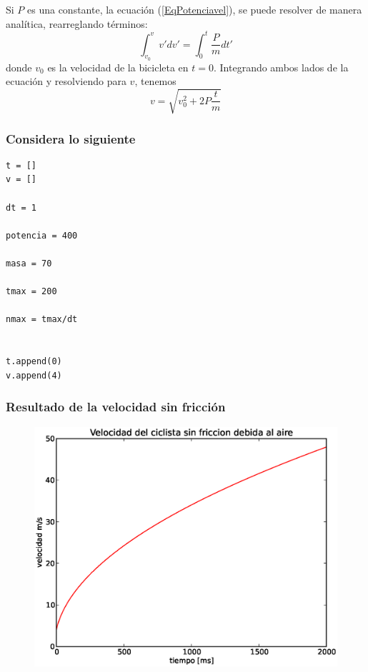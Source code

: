 \begin{frame}
Si $P$ es una constante, la ecuación (\ref{EqPotenciavel}), se puede resolver de manera analítica, rearreglando términos:
\begin{equation}\label{EqIntegral}
\int_{v_{0}}^{v} v' dv' = \int_{0}^{t} \dfrac{P}{m} dt'
\end{equation}
donde $v_{0}$ es la velocidad de la bicicleta en $t=0$. Integrando ambos lados de la ecuación y resolviendo para $v$, tenemos
\begin{equation}\label{Eqvres}
v = \sqrt{v_{0}^{2} + 2 P \dfrac{t}{m}}
\end{equation}
\end{frame}
\begin{frame}[fragile]
\frametitle{Considera lo siguiente}
\begin{verbatim}
t = []
v = []

dt = 1

potencia = 400

masa = 70

tmax = 200

nmax = tmax/dt


t.append(0)
v.append(4)
\end{verbatim}
\end{frame}
\begin{frame}
\frametitle{Resultado de la velocidad sin fricción}
\begin{figure}
	\centering
	\includegraphics[scale=0.5]{EjerBicicleta01.eps}
\end{figure}
\end{frame}
